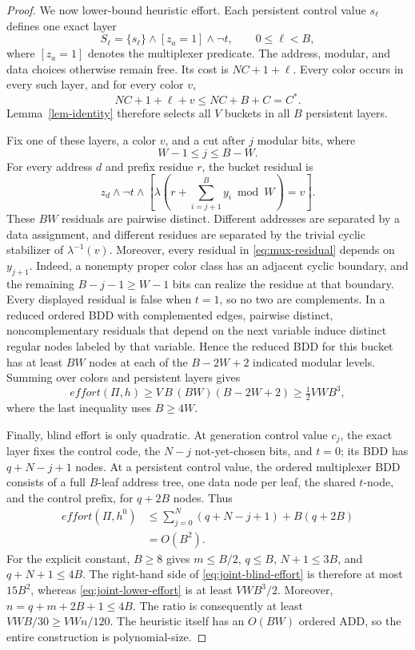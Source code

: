 \documentclass[letterpaper]{article}
\newcommand{\task}{\ensuremath{\Pi}}
\newcommand{\hblind}{\ensuremath{h^{0}}}
\newcommand{\copt}{\ensuremath{C^{*}}}
\newcommand{\values}{\ensuremath{V}}
\newcommand{\effort}{\ensuremath{\mathit{effort}}}
\theoremstyle{plain}
\theoremstyle{definition}
\theoremstyle{remark}
\begin{document}
\begin{proof}
We now lower-bound heuristic effort.  Each persistent control value $s_\ell$
defines one exact layer
\[
 S_\ell=\{s_\ell\}\wedge[z_a=1]\wedge\neg t,
 \qquad 0\leq\ell<B,
\]
where $[z_a=1]$ denotes the multiplexer predicate.  The address, modular, and
data choices otherwise remain free.  Its cost is $NC+1+\ell$.  Every color
occurs in every such layer, and for every color $v$,
\[
 NC+1+\ell+v\leq NC+B+C=\copt.
\]
Lemma~\ref{lem-identity} therefore selects all $\values$ buckets in all $B$
persistent layers.

Fix one of these layers, a color $v$, and a cut after $j$ modular bits, where
\[
 W-1\leq j\leq B-W.
\]
For every address $d$ and prefix residue $r$, the bucket residual is
\[
 z_d\wedge\neg t\wedge
 \left[
 \lambda\!\left(r+\sum_{i=j+1}^B y_i\bmod W\right)=v
 \right].
\tag{1}\label{eq:mux-residual}
\]
These $BW$ residuals are pairwise distinct.  Different addresses are
separated by a data assignment, and different residues are separated by the
trivial cyclic stabilizer of $\lambda^{-1}(v)$.  Moreover, every residual in
\eqref{eq:mux-residual} depends on $y_{j+1}$.  Indeed, a nonempty proper color
class has an adjacent cyclic boundary, and the remaining $B-j-1\geq W-1$
bits can realize the residue at that boundary. Every displayed residual is
false when $t=1$, so no two are complements. In a reduced ordered BDD with
complemented edges, pairwise distinct, noncomplementary residuals that depend
on the next variable induce distinct regular nodes labeled by that variable.
Hence the reduced BDD for this bucket has at
least $BW$ nodes at each of the
$B-2W+2$ indicated modular levels.  Summing over colors and persistent layers
gives
\[
 \effort(\task,h)
 \geq \values\,B\,(BW)(B-2W+2)
 \geq \tfrac12\values WB^3,
\tag{2}\label{eq:joint-lower-effort}
\]
where the last inequality uses $B\geq4W$.

Finally, blind effort is only quadratic.  At generation control value $c_j$,
the exact layer fixes the control code, the $N-j$ not-yet-chosen bits, and
$t=0$; its BDD has $q+N-j+1$ nodes.  At a persistent control value, the
ordered multiplexer BDD consists of a full $B$-leaf address tree, one data
node per leaf, the shared $t$-node, and the control prefix, for $q+2B$ nodes.
Thus
\[
\begin{aligned}
 \effort(\task,\hblind)
 &\leq \sum_{j=0}^{N}(q+N-j+1)+B(q+2B)\\
 &=O(B^2).
\end{aligned}
\tag{3}\label{eq:joint-blind-effort}
\]
For the explicit constant, $B\geq8$ gives $m\leq B/2$, $q\leq B$,
$N+1\leq3B$, and $q+N+1\leq4B$.  The right-hand side of
\eqref{eq:joint-blind-effort} is therefore at most $15B^2$, whereas
\eqref{eq:joint-lower-effort} is at least $\values WB^3/2$.  Moreover,
$n=q+m+2B+1\leq4B$.  The ratio is consequently at least
$\values WB/30\geq\values Wn/120$.  The heuristic itself has an $O(BW)$
ordered ADD, so the entire construction is polynomial-size.
\end{proof}
\end{document}
